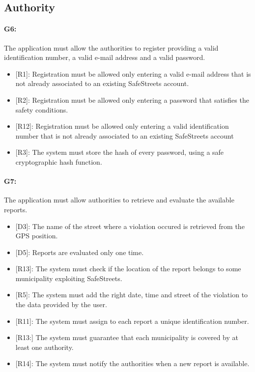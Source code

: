 \documentclass[12pt,a4paper]{report}
\begin{document}
		\subsection{Authority}
			
			\paragraph {G6:} The application must allow the authorities to register providing a valid identification number, a valid e-mail address and a valid password.
				\begin{itemize}
					\item{[R1]:} Registration must be allowed only entering a valid e-mail address that is not already associated to an existing SafeStreets account.
					\item{[R2]:} Registration must be allowed only entering a password that satisfies the safety conditions.
					\item{[R12]:} Registration must be allowed only entering a valid identification number that is not already associated to an existing SafeStreets account
					\item{[R3]:} The system must store the hash of every password, using a safe cryptographic hash function.
				\end{itemize}

			\paragraph {G7:} The application must allow authorities to retrieve and evaluate the available reports.
				\begin{itemize}
					\item{[D3]:} The name of the street where a violation occured is retrieved from the GPS position.
					\item{[D5]:} Reports are evaluated only one time.
				\end{itemize}
				\begin{itemize}
					\item{[R13]:} The system must check if the location of the report belongs to some municipality exploiting SafeStreets.
					\item{[R5]:} The system must add the right date, time and street of the violation to the data provided by the user.
					\item{[R11]:} The system must assign to each report a unique identification number.
					\item{[R13:]} The system must guarantee that each municipality is covered by at least one authority.
					\item{[R14]:} The system must notify the authorities when a new report is available.
				\end{itemize}
\end{document}
